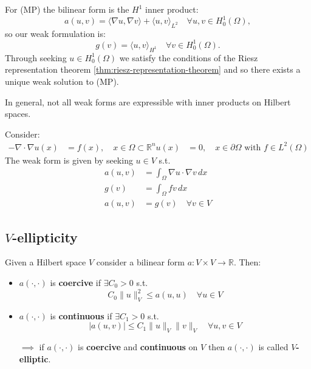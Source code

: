 \begin{corollary}{}{}
    For (MP) the bilinear form is the $H^1$ inner product:
    \[
        a(u, v) = \langle \nabla u, \nabla v \rangle + \langle u, v \rangle_{L^2} \quad \forall u, v \in H_0^1(\Omega),
    \]
    so our weak formulation is:
    \[
        g(v) = \langle u, v \rangle_{H^1} \quad \forall v \in H_0^1(\Omega).
    \]
    Through seeking $u \in H_0^1(\Omega)$ we satisfy the conditions of the Riesz representation theorem \ref{thm:riesz-representation-theorem} and so there exists a unique weak solution to (MP).
\end{corollary}

In general, not all weak forms are expressible with inner products on Hilbert spaces.

Consider:
\begin{align*}
    -\nabla \cdot \nabla u(x) & = f(x), \quad x \in \Omega \subset \mathbb{R}^n
    u(x)                      & = 0, \quad x \in \partial \Omega \text{ with } f \in L^2(\Omega)
\end{align*}
The weak form is given by seeking $u \in V$ s.t.
\begin{align*}
    a(u, v) & = \int_\Omega \nabla u \cdot \nabla v \, dx \\
    g(v)    & = \int_\Omega f v \, dx                     \\
    a(u, v) & = g(v) \quad \forall v \in V \tag{MP2}
\end{align*}

\subsection{$V$-ellipticity}

Given a Hilbert space $V$ consider a bilinear form $a: V \times V \to \mathbb{R}$. Then:
\begin{itemize}
    \item $a(\cdot, \cdot)$ is \textbf{coercive} if $\exists C_0 > 0$ s.t.
          \[
              C_0 \|u\|_V^2 \leq a(u, u) \quad \forall u \in V
          \]
    \item $a(\cdot, \cdot)$ is \textbf{continuous} if $\exists C_1 > 0$ s.t.
          \[
              |a(u, v)| \leq C_1 \|u\|_V \|v\|_V \quad \forall u, v \in V
          \]
    \item[$\implies$] if $a(\cdot, \cdot)$ is \textbf{coercive} and \textbf{continuous} on $V$ then $a(\cdot, \cdot)$ is called \textbf{$V$-elliptic}.
\end{itemize}

